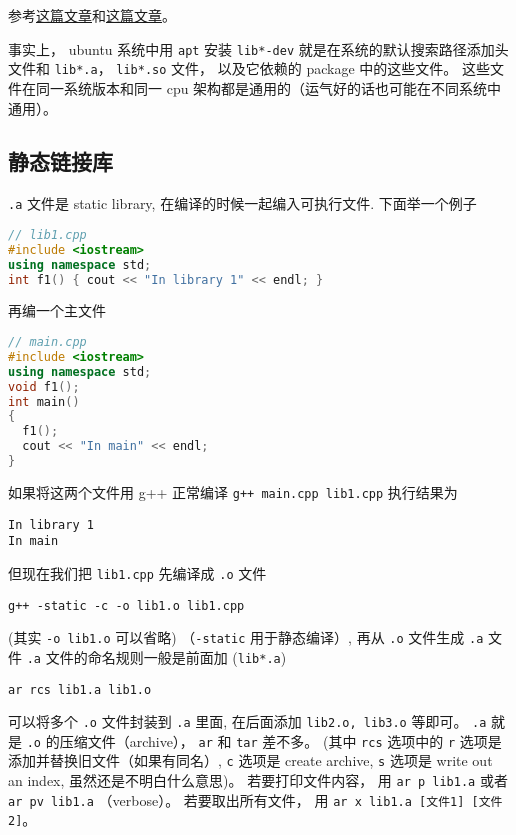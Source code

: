 
\begin{issues}
\issueDraft
\end{issues}


参考\href{https://blog.feabhas.com/2014/04/static-and-dynamic-libraries-on-linux/}{这篇文章}和\href{https://gcc.gnu.org/onlinedocs/gcc/Link-Options.html}{这篇文章}。

事实上， ubuntu 系统中用 \verb|apt| 安装 \verb|lib*-dev| 就是在系统的默认搜索路径添加头文件和 \verb|lib*.a|， \verb|lib*.so| 文件， 以及它依赖的 package 中的这些文件。 这些文件在同一系统版本和同一 cpu 架构都是通用的（运气好的话也可能在不同系统中通用）。

\subsection{静态链接库}

\verb|.a| 文件是 static library, 在编译的时候一起编入可执行文件. 下面举一个例子

\begin{lstlisting}[language=cpp]
// lib1.cpp
#include <iostream>
using namespace std;
int f1() { cout << "In library 1" << endl; }
\end{lstlisting}

再编一个主文件

\begin{lstlisting}[language=cpp]
// main.cpp
#include <iostream>
using namespace std;
void f1();
int main()
{
  f1();
  cout << "In main" << endl;
}
\end{lstlisting}

如果将这两个文件用 g++ 正常编译 \verb`g++ main.cpp lib1.cpp` 执行结果为
\begin{lstlisting}[language=none]
In library 1
In main
\end{lstlisting}
但现在我们把 \verb|lib1.cpp| 先编译成 \verb|.o| 文件

\begin{lstlisting}[language=none]
g++ -static -c -o lib1.o lib1.cpp
\end{lstlisting}

(其实 \verb`-o lib1.o` 可以省略) （\verb`-static` 用于静态编译）, 再从 \verb|.o| 文件生成 \verb|.a| 文件 \verb|.a| 文件的命名规则一般是前面加 (\verb`lib*.a`)

\begin{lstlisting}[language=none]
ar rcs lib1.a lib1.o
\end{lstlisting}
可以将多个 \verb|.o| 文件封装到 \verb|.a| 里面, 在后面添加 \verb|lib2.o, lib3.o| 等即可。 \verb`.a` 就是 \verb`.o` 的压缩文件（archive）， \verb`ar` 和 \verb`tar` 差不多。 (其中 \verb|rcs| 选项中的 \verb`r` 选项是添加并替换旧文件（如果有同名）, \verb`c` 选项是 create archive, \verb`s` 选项是 write out an index, 虽然还是不明白什么意思)。 若要打印文件内容， 用 \verb|ar p lib1.a| 或者 \verb|ar pv lib1.a| （verbose）。 若要取出所有文件， 用 \verb|ar x lib1.a [文件1] [文件2]|。


